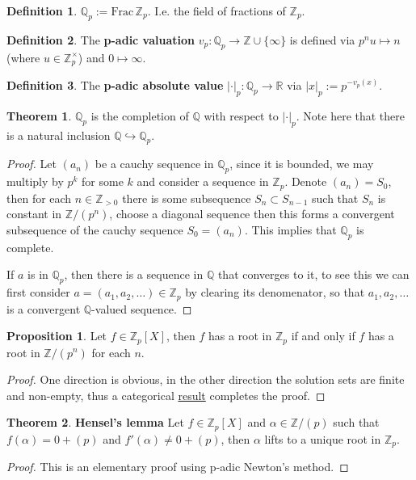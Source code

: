 \documentclass[11pt]{article}
\theoremstyle{definition}
\newtheorem{defn}{Definition}
\newtheorem{thm}{Theorem}
\newtheorem{prop}{Proposition}
\newcommand{\set}[1]{\{#1\}}
\newcommand{\abs}[1]{\lvert#1\rvert}
\begin{document}
    \begin{defn}
        \(\mathbb{Q}_p := \text{Frac}\,\mathbb{Z}_p\). I.e. the field of fractions of \(\mathbb{Z}_p\).
    \end{defn}
    \begin{defn}
        The \textbf{p-adic valuation} \(v_p: \mathbb{Q}_p \to \mathbb{Z}\cup\set{\infty}\) is defined via \(p^nu \mapsto n\) (where \(u \in \mathbb{Z}_p^\times\)) and \(0 \mapsto \infty\).
    \end{defn}
    \begin{defn}
        The \textbf{p-adic absolute value} \(\abs{\cdot}_p : \mathbb{Q}_p \to \mathbb{R}\) via \(\abs{x}_p := p^{-v_p(x)}\).
    \end{defn}
    \begin{thm}
        \(\mathbb{Q}_p\) is the completion of \(\mathbb{Q}\) with respect to \(\abs{\cdot}_p\). Note here that there is a natural inclusion \(\mathbb{Q} \hookrightarrow \mathbb{Q}_p\).
        \begin{proof}
            Let \((a_n)\) be a cauchy sequence in \(\mathbb{Q}_p\), since it is bounded, we may multiply by \(p^k\) for some \(k\) and consider a sequence in \(\mathbb{Z}_p\). Denote \((a_n) = S_0\), then for each \(n \in \mathbb{Z}_{>0}\) there is some subsequence \(S_n \subset S_{n-1}\) such that \(S_n\) is constant in \(\mathbb{Z}/(p^n)\), choose a diagonal sequence then this forms a convergent subsequence of the cauchy sequence \(S_0 = (a_n)\). This implies that \(\mathbb{Q}_p\) is complete.

            If \(a\) is in \(\mathbb{Q}_p\), then there is a sequence in \(\mathbb{Q}\) that converges to it, to see this we can first consider \(a= (a_1,a_2,\hdots) \in \mathbb{Z}_p\) by clearing its denomenator, so that \(a_1,a_2,\hdots\) is a convergent \(\mathbb{Q}\)-valued sequence.
        \end{proof}
    \end{thm}
    \begin{prop}
        Let \(f \in \mathbb{Z}_p[X]\), then \(f\) has a root in \(\mathbb{Z}_p\) if and only if \(f\) has a root in \(\mathbb{Z}/(p^n)\) for each \(n\).
        \begin{proof}
            One direction is obvious, in the other direction the solution sets are finite and non-empty, thus a categorical \hyperref[nonemptyinvlimit]{result} completes the proof.
        \end{proof}
    \end{prop}
    \begin{thm}\label{hensel}
        \textbf{Hensel's lemma} Let \(f \in \mathbb{Z}_p[X]\) and \(\alpha \in \mathbb{Z}/(p)\) such that \(f(\alpha) = 0 + (p)\) and \(f'(\alpha) \neq 0 + (p)\), then \(\alpha\) lifts to a unique root in \(\mathbb{Z}_p\).

        \begin{proof}
            This is an elementary proof using p-adic Newton's method.
        \end{proof}
    \end{thm}
\end{document}

